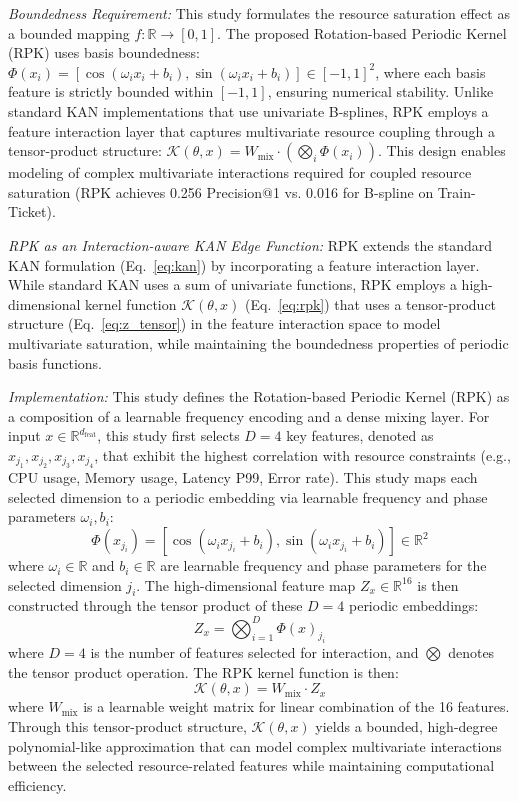 \documentclass[conference]{IEEEtran}
\begin{document}
\textit{Boundedness Requirement:} This study formulates the resource saturation effect as a bounded mapping $f: \mathbb{R} \rightarrow [0, 1]$. The proposed Rotation-based Periodic Kernel (RPK) uses basis boundedness: $\Phi(x_i) = [\cos(\omega_i x_i + b_i), \sin(\omega_i x_i + b_i)] \in [-1, 1]^2$, where each basis feature is strictly bounded within $[-1, 1]$, ensuring numerical stability. Unlike standard KAN implementations that use univariate B-splines, RPK employs a feature interaction layer that captures multivariate resource coupling through a tensor-product structure: $\mathcal{K}(\theta, x) = W_{\text{mix}} \cdot (\bigotimes_{i} \Phi(x_i))$. This design enables modeling of complex multivariate interactions required for coupled resource saturation (RPK achieves 0.256 Precision@1 vs. 0.016 for B-spline on Train-Ticket).

\textit{RPK as an Interaction-aware KAN Edge Function:} RPK extends the standard KAN formulation (Eq.~\ref{eq:kan}) by incorporating a feature interaction layer. While standard KAN uses a sum of univariate functions, RPK employs a high-dimensional kernel function $\mathcal{K}(\theta, x)$ (Eq.~\ref{eq:rpk}) that uses a tensor-product structure (Eq.~\ref{eq:z_tensor}) in the feature interaction space to model multivariate saturation, while maintaining the boundedness properties of periodic basis functions.

\textit{Implementation:} This study defines the Rotation-based Periodic Kernel (RPK) as a composition of a learnable frequency encoding and a dense mixing layer. For input $x \in \mathbb{R}^{d_{\text{feat}}}$, this study first selects $D=4$ key features, denoted as $x_{j_1}, x_{j_2}, x_{j_3}, x_{j_4}$, that exhibit the highest correlation with resource constraints (e.g., CPU usage, Memory usage, Latency P99, Error rate). This study maps each selected dimension to a periodic embedding via learnable frequency and phase parameters $\omega_i, b_i$:
\begin{equation}
\Phi(x_{j_i}) = [\cos(\omega_i x_{j_i} + b_i), \sin(\omega_i x_{j_i} + b_i)] \in \mathbb{R}^2
\label{eq:periodic_embedding}
\end{equation}
where $\omega_i \in \mathbb{R}$ and $b_i \in \mathbb{R}$ are learnable frequency and phase parameters for the selected dimension $j_i$. The high-dimensional feature map $Z_x \in \mathbb{R}^{16}$ is then constructed through the tensor product of these $D=4$ periodic embeddings:
\begin{equation}
Z_x = \bigotimes_{i=1}^{D} \Phi(x)_{j_i}
\label{eq:z_tensor}
\end{equation}
where $D=4$ is the number of features selected for interaction, and $\bigotimes$ denotes the tensor product operation. The RPK kernel function is then:
\begin{equation}
\mathcal{K}(\theta, x) = W_{\text{mix}} \cdot Z_x
\label{eq:rpk}
\end{equation}
where $W_{\text{mix}}$ is a learnable weight matrix for linear combination of the 16 features. Through this tensor-product structure, $\mathcal{K}(\theta, x)$ yields a bounded, high-degree polynomial-like approximation that can model complex multivariate interactions between the selected resource-related features while maintaining computational efficiency. 
\end{document}
